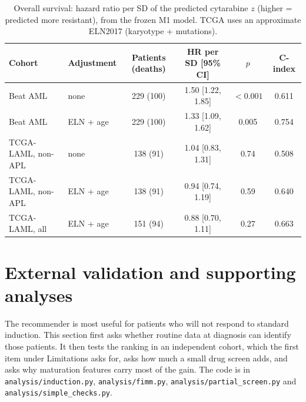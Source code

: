 \documentclass[11pt,logo,nonumbering]{preprint}
\newcommand{\z}{z}
\begin{document}
\begin{table}[ht]
\small
\centering
\caption{Overall survival: hazard ratio per SD of the predicted cytarabine $\z$ (higher = predicted more resistant), from the frozen M1 model. TCGA uses an approximate ELN2017 (karyotype + mutations).}
\label{tab:tcga}
\begin{tabular}{@{}llcccc@{}}
\toprule
Cohort & Adjustment & Patients (deaths) & HR per SD [95\% CI] & $p$ & C-index\\
\midrule
Beat AML & none & 229 (100) & 1.50 [1.22, 1.85] & $<0.001$ & 0.611\\
Beat AML & ELN + age & 229 (100) & 1.33 [1.09, 1.62] & 0.005 & 0.754\\
TCGA-LAML, non-APL & none & 138 (91) & 1.04 [0.83, 1.31] & 0.74 & 0.508\\
TCGA-LAML, non-APL & ELN + age & 138 (91) & 0.94 [0.74, 1.19] & 0.59 & 0.640\\
TCGA-LAML, all & ELN + age & 151 (94) & 0.88 [0.70, 1.11] & 0.27 & 0.663\\
\bottomrule
\end{tabular}
\end{table}

\section{External validation and supporting analyses}\label{sec:extension}
The recommender is most useful for patients who will not respond to standard induction. This section first asks whether routine data at diagnosis can identify those patients. It then tests the ranking in an independent cohort, which the first item under Limitations asks for, asks how much a small drug screen adds, and asks why maturation features carry most of the gain. The code is in \texttt{analysis/induction.py}, \texttt{analysis/fimm.py}, \texttt{analysis/partial\_screen.py} and \texttt{analysis/simple\_checks.py}.
\end{document}

